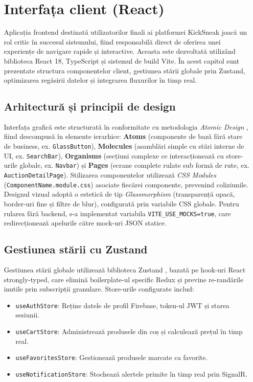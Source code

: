 \chapter{Interfața client (React)}

Aplicația frontend destinată utilizatorilor finali ai platformei KickSneak joacă un rol critic în succesul sistemului, fiind responsabilă direct de oferirea unei experiențe de navigare rapide și interactive. Aceasta este dezvoltată utilizând biblioteca React 18, TypeScript și sistemul de build Vite. În acest capitol sunt prezentate structura componentelor client, gestiunea stării globale prin Zustand, optimizarea regăsirii datelor și integrarea fluxurilor în timp real.

\section{Arhitectură și principii de design}

Interfața grafică este structurată în conformitate cu metodologia \textit{Atomic Design} \cite{frost2016atomic}, fiind descompusă în elemente ierarhice: \textbf{Atoms} (componente de bază fără stare de business, ex. \texttt{GlassButton}), \textbf{Molecules} (asamblări simple cu stări interne de UI, ex. \texttt{SearchBar}), \textbf{Organisms} (secțiuni complexe ce interacționează cu store-urile globale, ex. \texttt{Navbar}) și \textbf{Pages} (ecrane complete rulate sub formă de rute, ex. \texttt{AuctionDetailPage}). Stilizarea componentelor utilizează \textit{CSS Modules} (\texttt{ComponentName.module.css}) asociate fiecărei componente, prevenind coliziunile. Designul vizual adoptă o estetică de tip \textit{Glassmorphism} (transparență opacă, border-uri fine și filtre de blur), configurată prin variabile CSS globale. Pentru rularea fără backend, s-a implementat variabila \texttt{VITE\_USE\_MOCKS=true}, care redirecționează apelurile către mock-uri JSON statice.

\section{Gestiunea stării cu Zustand}

Gestiunea stării globale utilizează biblioteca Zustand \cite{zustand}, bazată pe hook-uri React strongly-typed, care elimină boilerplate-ul specific Redux și previne re-randările inutile prin subscripții granulare. Store-urile configurate includ:
\begin{itemize}
    \item \texttt{useAuthStore}: Reține datele de profil Firebase, token-ul JWT și starea sesiunii.
    \item \texttt{useCartStore}: Administrează produsele din coș și calculează prețul în timp real.
    \item \texttt{useFavoritesStore}: Gestionează produsele marcate ca favorite.
    \item \texttt{useNotificationStore}: Stochează alertele primite în timp real prin SignalR.
\end{itemize}

